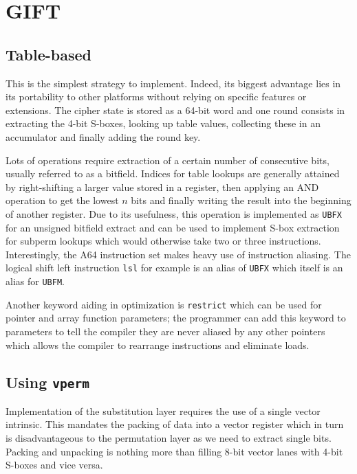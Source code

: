 \section{GIFT}
\subsection{Table-based}

This is the simplest strategy to implement. Indeed, its biggest advantage lies
in its portability to other platforms without relying on specific features or
extensions. The cipher state is stored as a 64-bit word and one round consists
in extracting the 4-bit S-boxes, looking up table values, collecting these in
an accumulator and finally adding the round key.




Lots of operations require extraction of a certain number of consecutive bits,
usually referred to as a bitfield. Indices for table lookups are generally
attained by right-shifting a larger value stored in a register, then applying
an AND operation to get the lowest $n$ bits and finally writing the result into
the beginning of another register. Due to its usefulness, this operation is
implemented as \texttt{UBFX} for an unsigned bitfield extract and can be used
to implement S-box extraction for subperm lookups which would otherwise take
two or three instructions. Interestingly, the A64 instruction set makes
heavy use of instruction aliasing. The logical shift left instruction
\texttt{lsl} for example is an alias of \texttt{UBFX} which itself is an alias
for \texttt{UBFM}.

Another keyword aiding in optimization is \texttt{restrict} which can be used
for pointer and array function parameters; the programmer can add this keyword
to parameters to tell the compiler they are never aliased by any other pointers
which allows the compiler to rearrange instructions and eliminate loads.

\subsection{Using \texttt{vperm}}

Implementation of the substitution layer requires the use of a single vector
intrinsic. This mandates the packing of data into a vector register which in
turn is disadvantageous to the permutation layer as we need to extract single
bits. Packing and unpacking is nothing more than filling 8-bit vector lanes
with 4-bit S-boxes and vice versa.

